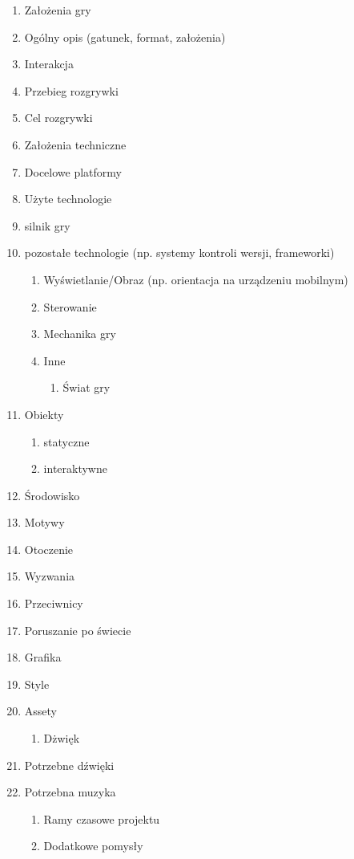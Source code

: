 \documentclass[brudnopis]{xmgr}
\begin{document}
\begin{enumerate}
  \item Założenia gry
  \item Ogólny opis (gatunek, format, założenia)
  \item Interakcja
  \item Przebieg rozgrywki
  \item Cel rozgrywki
  \item Założenia techniczne
  \item Docelowe platformy
  \item Użyte technologie
  \item silnik gry
  \item pozostałe technologie (np. systemy kontroli wersji, frameworki)
  \begin{enumerate}
      \item Wyświetlanie/Obraz (np. orientacja na urządzeniu mobilnym)
      \item Sterowanie
      \item  Mechanika gry
      \item Inne
      \begin{enumerate}
         \item  Świat gry
      \end{enumerate}
  \end{enumerate}
  \item Obiekty
  \begin{enumerate}
     \item statyczne
     \item interaktywne
  \end{enumerate}
  \item Środowisko
  \item Motywy 
  \item Otoczenie
  \item Wyzwania
  \item Przeciwnicy
  \item Poruszanie po świecie
  \item Grafika
  \item Style
  \item Assety
  \begin{enumerate}
     \item Dżwięk
  \end{enumerate}
  \item Potrzebne dźwięki
  \item Potrzebna muzyka
  \begin{enumerate}
     \item Ramy czasowe projektu
     \item Dodatkowe pomysły
  \end{enumerate}
\end{enumerate}
\end{document}
